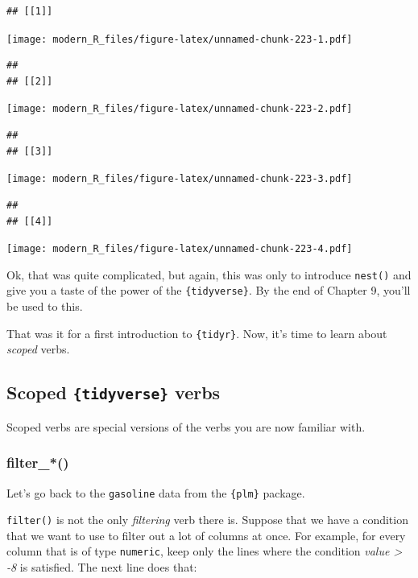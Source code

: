 \documentclass[]{gitbook}
\theoremstyle{definition}
\theoremstyle{definition}
\theoremstyle{definition}
\theoremstyle{remark}
\begin{document}
\begin{verbatim}
## [[1]]
\end{verbatim}

\texttt{[image: modern\_R\_files/figure-latex/unnamed-chunk-223-1.pdf]}

\begin{verbatim}
## 
## [[2]]
\end{verbatim}

\texttt{[image: modern\_R\_files/figure-latex/unnamed-chunk-223-2.pdf]}

\begin{verbatim}
## 
## [[3]]
\end{verbatim}

\texttt{[image: modern\_R\_files/figure-latex/unnamed-chunk-223-3.pdf]}

\begin{verbatim}
## 
## [[4]]
\end{verbatim}

\texttt{[image: modern\_R\_files/figure-latex/unnamed-chunk-223-4.pdf]}

Ok, that was quite complicated, but again, this was only to introduce
\texttt{nest()} and give you a taste of the power of the
\texttt{\{tidyverse\}}. By the end of Chapter 9, you'll be used to this.

That was it for a first introduction to \texttt{\{tidyr\}}. Now, it's
time to learn about \emph{scoped} verbs.

\hypertarget{scoped-tidyverse-verbs}{%
\subsection{\texorpdfstring{Scoped \texttt{\{tidyverse\}}
verbs}{Scoped \{tidyverse\} verbs}}\label{scoped-tidyverse-verbs}}

Scoped verbs are special versions of the verbs you are now familiar
with.

\hypertarget{filter_}{%
\subsubsection{filter\_*()}\label{filter_}}

Let's go back to the \texttt{gasoline} data from the \texttt{\{plm\}}
package.

\texttt{filter()} is not the only \emph{filtering} verb there is.
Suppose that we have a condition that we want to use to filter out a lot
of columns at once. For example, for every column that is of type
\texttt{numeric}, keep only the lines where the condition \emph{value
\textgreater{} -8} is satisfied. The next line does that:
\end{document}

